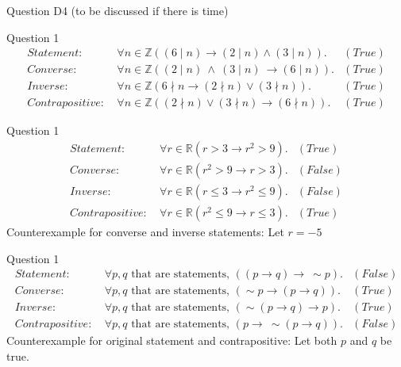 \documentclass[10pt]{beamer}
\begin{document}
\begin{frame}[fragile]{Question D4}
(to be discussed if there is time)
\end{frame}

\begin{frame}[fragile]{Question 1}
\begin{align*}
Statement: \ &\forall n \in \mathbb{Z}((6\mid n) \rightarrow (2\mid n) \land (3 \mid n) ). &(True) \\
Converse: \ &\forall n \in \mathbb{Z}((2\mid n) \ \land \ (3\mid n) \ \rightarrow (6\mid n) ). &(True) \\
Inverse: \ &\forall n \in \mathbb{Z}(6\nmid n \rightarrow (2\nmid n) \lor (3\nmid n) ). &(True) \\
Contrapositive: \ &\forall n \in \mathbb{Z}((2\nmid n) \lor (3\nmid n) \rightarrow (6\nmid n) ). &(True)
\end{align*} 
\end{frame}

\begin{frame}[fragile]{Question 1}
\begin{align*}
Statement: \ &\forall r \in \mathbb{R}(r>3 \rightarrow r^2>9). &(True) \\
Converse: \ &\forall r \in \mathbb{R}(r^2>9 \rightarrow r>3). &(False) \\
Inverse: \ &\forall r \in \mathbb{R}(r\leq 3 \rightarrow r^2\leq 9).  &(False) \\
Contrapositive: \ &\forall r \in \mathbb{R}(r^2\leq 9 \rightarrow r\leq 3). &(True)
\end{align*} 
Counterexample for converse and inverse statements: Let $r = -5$
\end{frame}

\begin{frame}[fragile]{Question 1}
\begin{align*}
Statement: \ &\forall p, q\text{ that are statements, } ((p  \rightarrow q) \rightarrow \ \sim p ). &(False) \\
Converse: \ &\forall p, q\text{ that are statements, } (\sim p  \rightarrow (p  \rightarrow q)). &(True) \\
Inverse: \ &\forall p, q\text{ that are statements, } (\sim(p  \rightarrow q) \rightarrow p ). &(True) \\
Contrapositive:  \ &\forall p, q\text{ that are statements, } (p  \rightarrow \ \sim(p  \rightarrow q)). &(False)
\end{align*} 
Counterexample for original statement and contrapositive: Let both $p$ and $q$ be true.
\end{frame}
\end{document}
